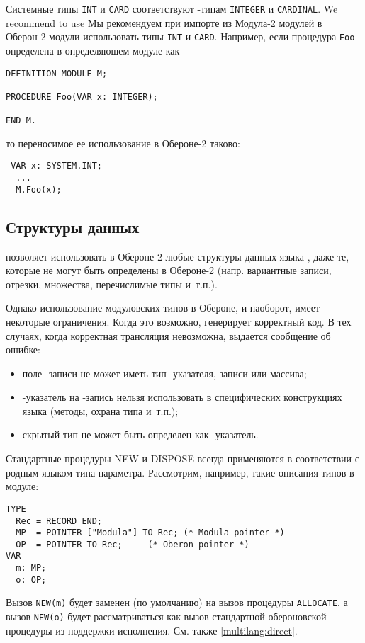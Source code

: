 Системные типы {\tt INT} и {\tt CARD} соответствуют
\mt{}-типам {\tt INTEGER} и {\tt CARDINAL}.
We recommend to use 
Мы рекомендуем при импорте из Модула-2 модулей в Оберон-2 модули
использовать типы {\tt INT} и {\tt CARD}.
Например, если процедура {\tt Foo} определена в
\mt{} определяющем модуле как
\begin{verbatim}
DEFINITION MODULE M;

PROCEDURE Foo(VAR x: INTEGER);

END M.
\end{verbatim}
то переносимое ее использование в Обероне-2 таково:
\begin{verbatim}
 VAR x: SYSTEM.INT;
  ...
  M.Foo(x);
\end{verbatim}

\subsection{Структуры данных}

\xds{} позволяет использовать в Обероне-2 любые структуры данных
языка \mt{}, даже те, которые не могут быть определены в Обероне-2
(напр. вариантные записи, отрезки, множества, перечислимые типы и~т.п.).

Однако использование модуловских типов в Обероне, и наоборот,
имеет некоторые ограничения. 
Когда это возможно, \xds{} генерирует корректный код. 
В тех случаях, когда корректная трансляция невозможна, выдается 
сообщение об ошибке:
\begin{itemize}
\item
  поле \mt{}-записи не может иметь тип \ot{}-указателя, записи или массива;
\item
  \mt{}-указатель на \ot{}-запись нельзя использовать в специфических
конструкциях языка \ot{} (методы, охрана типа и~т.п.);
\item
  скрытый тип не может быть определен как \ot{}-указатель.
\end{itemize}

Стандартные процедуры NEW и DISPOSE всегда применяются в соответствии
с родным языком типа параметра. Рассмотрим, например, такие описания 
типов в \ot{} модуле:
\begin{verbatim}
TYPE
  Rec = RECORD END;
  MP  = POINTER ["Modula"] TO Rec; (* Modula pointer *)
  OP  = POINTER TO Rec;     (* Oberon pointer *)
VAR
  m: MP;
  o: OP;
\end{verbatim}
Вызов \verb|NEW(m)| будет заменен (по умолчанию) на вызов
\mt{} процедуры {\tt ALLOCATE}, а вызов \verb|NEW(o)| будет рассматриваться
как вызов стандартной обероновской процедуры из поддержки исполнения.
См. также \ref{multilang:direct}.

